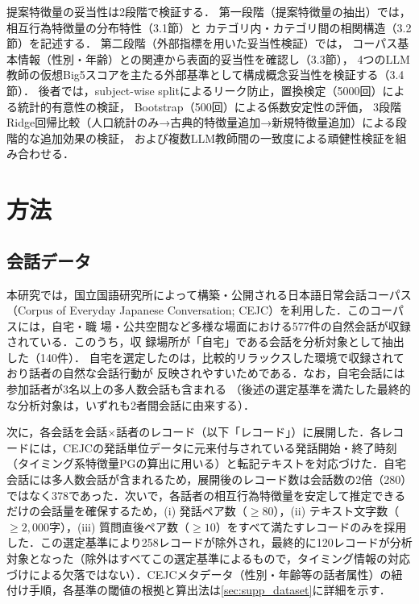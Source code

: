 \documentclass[dvipdfmx,11pt,a4paper]{bxjsarticle}
\renewcommand{\_}{\paperorigunderscore\allowbreak}%
\begin{document}
提案特徴量の妥当性は2段階で検証する．
第一段階（提案特徴量の抽出）では，相互行為特徴量の分布特性（3.1節）と
カテゴリ内・カテゴリ間の相関構造（3.2節）を記述する．
第二段階（外部指標を用いた妥当性検証）では，
コーパス基本情報（性別・年齢）との関連から表面的妥当性を確認し（3.3節），
4つのLLM教師の仮想Big5スコアを主たる外部基準として構成概念妥当性を検証する（3.4節）．
後者では，subject-wise splitによるリーク防止，置換検定（5000回）による統計的有意性の検証，
Bootstrap（500回）による係数安定性の評価，
3段階Ridge回帰比較（人口統計のみ→古典的特徴量追加→新規特徴量追加）による段階的な追加効果の検証，
および複数LLM教師間の一致度による頑健性検証を組み合わせる．

\section{方法}

\subsection{会話データ}
\label{sec:data}

本研究では，国立国語研究所によって構築・公開される日本語日常会話コーパス（Corpus
of Everyday Japanese Conversation; CEJC）を利用した．このコーパスには，自宅・職
場・公共空間など多様な場面における577件の自然会話が収録されている．このうち，収
録場所が「自宅」である会話を分析対象として抽出した（140件）．
自宅を選定したのは，比較的リラックスした環境で収録されており話者の自然な会話行動が
反映されやすいためである．なお，自宅会話には参加話者が3名以上の多人数会話も含まれる
（後述の選定基準を満たした最終的な分析対象は，いずれも2者間会話に由来する）．


次に，各会話を会話$\times$話者のレコード（以下「レコード」）に展開した．各レコードには，CEJCの発話単位データに元来付与されている発話開始・終了時刻（タイミング系特徴量PGの算出に用いる）と転記テキストを対応づけた．自宅会話には多人数会話が含まれるため，展開後のレコード数は会話数の2倍（280）ではなく378であった．次いで，各話者の相互行為特徴量を安定して推定できるだけの会話量を確保するため，(i) 発話ペア数（$\geq 80$），(ii) テキスト文字数（$\geq 2{,}000$字），(iii) 質問直後ペア数（$\geq 10$）をすべて満たすレコードのみを採用した．この選定基準により258レコードが除外され，最終的に120レコードが分析対象となった（除外はすべてこの選定基準によるもので，タイミング情報の対応づけによる欠落ではない）．CEJCメタデータ（性別・年齢等の話者属性）の紐付け手順，各基準の閾値の根拠と算出法は\ref{sec:supp_dataset}に詳細を示す．
\end{document}
